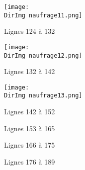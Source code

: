 \documentclass[a4paper,10pt]{article}
\newcommand{\DirImg}{../img/Naufrage/}
\begin{document}
\begin{figure}[!h]
  \centering
  \texttt{[image: \\DirImg naufrage11.png]}
  \caption{Lignes 124 à 132}
  \label{img11}
\end{figure}


\begin{figure}[!h]
  \centering
  \texttt{[image: \\DirImg naufrage12.png]}
  \caption{Lignes 132 à 142}
  \label{img12}
\end{figure}


\begin{figure}[!h]
  \centering
  \texttt{[image: \\DirImg naufrage13.png]}
  \caption{Lignes 142 à 152}
  \label{img13}
\end{figure}


\begin{figure}[!h]
  \centering
  \caption{Lignes 153 à 165}
  \label{img14}
\end{figure}


\begin{figure}[!h]
  \centering
  \caption{Lignes 166 à 175}
  \label{img15}
\end{figure}


\begin{figure}[!h]
  \centering
  \caption{Lignes 176 à 189}
  \label{img16}
\end{figure}



\end{document}
